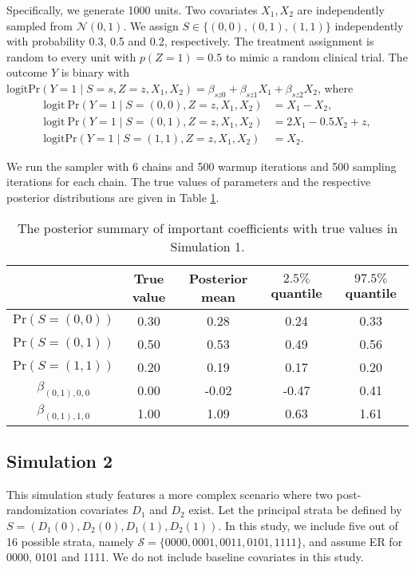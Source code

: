 \documentclass{article}
\begin{document}
Specifically, we generate 1000 units. Two covariates $X_1, X_2$ are independently sampled from $\mathcal{N}(0,1)$. We assign $S \in \{(0, 0), (0, 1), (1, 1)\}$ independently with probability 0.3, 0.5 and 0.2, respectively. The treatment assignment is random to every unit with $p(Z = 1) = 0.5$ to mimic a random clinical trial. The outcome $Y$ is binary with $\mathrm{logit} \mathrm{Pr}(Y = 1\mid S = s, Z = z, X_1, X_2) = \beta_{sz0} + \beta_{sz1}X_1 + \beta_{sz2} X_2$, where $$\begin{aligned}
  \mathrm{logit}~ \mathrm{Pr}(Y = 1\mid S = (0,0), Z = z, X_1, X_2) &= X_1 - X_2, \\
  \mathrm{logit}~ \mathrm{Pr}(Y = 1\mid S = (0,1), Z = z, X_1, X_2) &= 2X_1 - 0.5X_2 + z, \\
  \mathrm{logit} \mathrm{Pr}(Y = 1\mid S = (1,1), Z = z, X_1, X_2) &= X_2.
\end{aligned}$$

We run the sampler with 6 chains and 500 warmup iterations and 500 sampling iterations for each chain. The true values of parameters and the respective posterior distributions are given in Table \ref{tbl::sim1}.

\begin{table}[h]
  \centering
  \begin{tabular}{ccccc}
    \toprule
    & True value & Posterior mean & $2.5\%$ quantile & $97.5\%$ quantile \\
    \midrule
    $\mathrm{Pr}(S = (0,0))$ & 0.30 & 0.28 & 0.24 & 0.33 \\
    $\mathrm{Pr}(S = (0,1))$ & 0.50 & 0.53 & 0.49 & 0.56\\
    $\mathrm{Pr}(S = (1,1))$ & 0.20 & 0.19 & 0.17 & 0.20\\
    \midrule
    $\beta_{(0,1), 0, 0}$ & 0.00 & -0.02 & -0.47 & 0.41\\
    $\beta_{(0,1), 1, 0}$ & 1.00 & 1.09 & 0.63 & 1.61 \\
    \bottomrule
    \end{tabular}
    \caption{The posterior summary of important coefficients with true values in Simulation 1.}
    \label{tbl::sim1}
\end{table}
 
\subsection{Simulation 2}

This simulation study features a more complex scenario where two post-randomization covariates $D_1$ and $D_2$ exist. Let the principal strata be defined by $S = (D_1(0), D_2(0), D_1(1), D_2(1))$. In this study, we include five out of 16 possible strata, namely $\mathcal{S} = \{0000, 0001, 0011, 0101, 1111\}$, and assume ER for 0000, 0101 and 1111. We do not include baseline covariates in this study.
\end{document}
